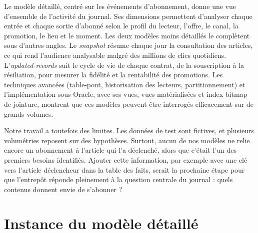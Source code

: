 \documentclass[a4paper,12pt]{article}
\begin{document}
Le modèle détaillé, centré sur les événements d'abonnement, donne une vue
d'ensemble de l'activité du journal. Ses dimensions permettent d'analyser
chaque entrée et chaque sortie d'abonné selon le profil du lecteur, l'offre,
le canal, la promotion, le lieu et le moment. Les deux modèles moins
détaillés le complètent sous d'autres angles. Le \emph{snapshot} résume
chaque jour la consultation des articles, ce qui rend l'audience analysable
malgré des millions de clics quotidiens. L'\emph{updated-records} suit le
cycle de vie de chaque contrat, de la souscription à la résiliation, pour
mesurer la fidélité et la rentabilité des promotions. Les techniques
avancées (table-pont, historisation des lecteurs, partitionnement) et
l'implémentation sous Oracle, avec ses vues, vues matérialisées et index
bitmap de jointure, montrent que ces modèles peuvent être interrogés
efficacement sur de grands volumes.

Notre travail a toutefois des limites. Les données de test sont fictives,
et plusieurs volumétries reposent sur des hypothèses. Surtout, aucun de nos
modèles ne relie encore un abonnement à l'article qui l'a déclenché, alors
que c'était l'un des premiers besoins identifiés. Ajouter cette information,
par exemple avec une clé vers l'article déclencheur dans la table des faits,
serait la prochaine étape pour que l'entrepôt réponde pleinement à la
question centrale du journal : quels contenus donnent envie de s'abonner ?


\newpage
\appendix

\section{Instance du modèle détaillé}
\label{annexe:instance-detaille}
\end{document}
